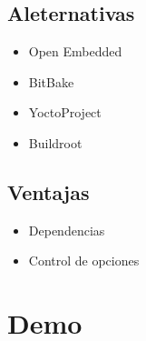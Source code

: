 \documentclass[11pt]{article}
\begin{document}
\subsection{Aleternativas}
\label{sec:org9292e66}
\begin{itemize}
\item Open Embedded
\item BitBake
\item YoctoProject
\item Buildroot
\end{itemize}

\subsection{Ventajas}
\label{sec:org6f03d30}
\begin{itemize}
\item Dependencias
\item Control de opciones
\end{itemize}

\section{Demo}
\label{sec:orgfda8075}
\end{document}
